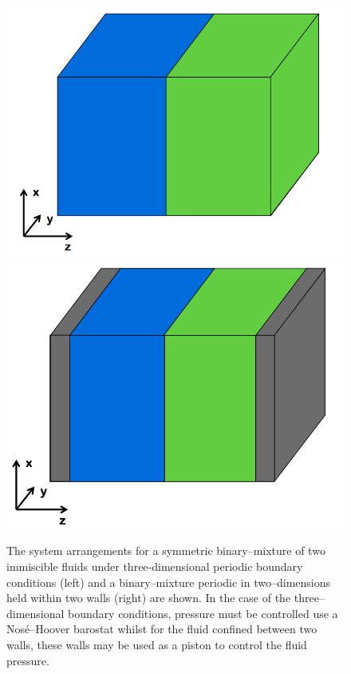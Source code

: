 \begin{figure}[h]
        \includegraphics[scale=0.25]{AABB.png}
        \includegraphics[scale=0.25]{AABB_piston.png}
\caption{The system arrangements for a symmetric binary--mixture of two immiscible fluids under three-dimensional periodic boundary conditions (left) and a binary--mixture periodic in two--dimensions held within two walls (right) are shown. 
In the case of the three--dimensional boundary conditions, pressure must be controlled use a Nos\'{e}--Hoover barostat whilst for the fluid confined between two walls, these walls may be used as a piston to control the fluid pressure.}
\label{SetUp}
\end{figure}


